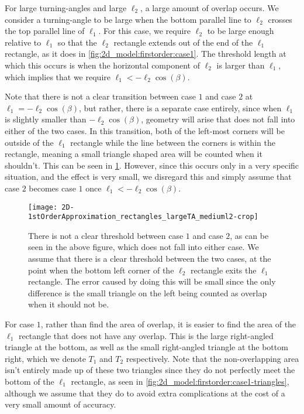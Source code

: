 For large turning-angles and large $\ell_2$, a large amount of overlap occurs. We consider a turning-angle to be large when the bottom parallel line to $\ell_2$ crosses the top parallel line of $\ell_1$. For this case, we require $\ell_2$ to be large enough relative to $\ell_1$ so that the $\ell_2$ rectangle extends out of the end of the $\ell_1$ rectangle, as it does in \cref{fig:2d_model:firstorder:case1}. The threshold length at which this occurs is when the horizontal component of $\ell_2$ is larger than $\ell_1$, which implies that we require $\ell_1 < -\ell_2 \cos (\beta)$. 

Note that there is not a clear transition between case $1$ and case $2$ at $\ell_1 = -\ell_2 \cos(\beta)$, but rather, there is a separate case entirely, since when $\ell_1$ is slightly smaller than $-\ell_2 \cos(\beta)$, geometry will arise that does not fall into either of the two cases. In this transition, both of the left-most corners will be outside of the $\ell_1$ rectangle while the line between the corners is within the rectangle, meaning a small triangle shaped area will be counted when it shouldn't. This can be seen in \cref{fig:2d_model:firstorder:case1-case2-threshold}. However, since this occurs only in a very specific situation, and the effect is very small, we disregard this and simply assume that case $2$ becomes case $1$ once $\ell_1 < -\ell_2 \cos(\beta)$.

\begin{figure}[h!]
	\centering
	\texttt{[image: 2D-1stOrderApproximation\_rectangles\_largeTA\_mediuml2-crop]}
	\caption[There is no clear threshold between case $1$ and case $2$, although we assume that there is since the introduced error is only small]{There is not a clear threshold between case $1$ and case $2$, as can be seen in the above figure, which does not fall into either case. We assume that there is a clear threshold between the two cases, at the point when the bottom left corner of the $\ell_2$ rectangle exits the $\ell_1$ rectangle. The error caused by doing this will be small since the only difference is the small triangle on the left being counted as overlap when it should not be.}
	\label{fig:2d_model:firstorder:case1-case2-threshold}
\end{figure}

For case $1$, rather than find the area of overlap, it is easier to find the area of the $\ell_1$ rectangle that does not have any overlap.  This is the large right-angled triangle at the bottom, as well as the small right-angled triangle at the bottom right, which we denote $T_1$ and $T_2$ respectively. Note that the non-overlapping area isn't entirely made up of these two triangles since they do not perfectly meet the bottom of the $\ell_1$ rectangle, as seen in \cref{fig:2d_model:firstorder:case1-triangles}, although we assume that they do to avoid extra complications at the cost of a very small amount of accuracy. 

